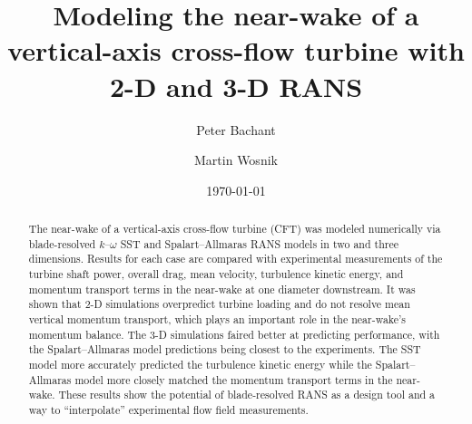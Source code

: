 \documentclass[aip,graphicx]{revtex4-1}
\begin{document}
\preprint{}

\title{Modeling the near-wake of a vertical-axis cross-flow turbine with 2-D and
    3-D RANS}



\author{Peter Bachant}

\author{Martin Wosnik}


\date{\today}

\begin{abstract}
    The near-wake of a vertical-axis cross-flow turbine (CFT) was modeled
    numerically via blade-resolved $k$--$\omega$ SST and Spalart--Allmaras RANS
    models in two and three dimensions. Results for each case are compared with
    experimental measurements of the turbine shaft power, overall drag, mean
    velocity, turbulence kinetic energy, and momentum transport terms in the
    near-wake at one diameter downstream. It was shown that 2-D simulations
    overpredict turbine loading and do not resolve mean vertical momentum
    transport, which plays an important role in the near-wake's momentum
    balance. The 3-D simulations faired better at predicting performance, with
    the Spalart--Allmaras model predictions being closest to the experiments.
    The SST model more accurately predicted the turbulence kinetic energy while
    the Spalart--Allmaras model more closely matched the momentum transport
    terms in the near-wake. These results show the potential of blade-resolved
    RANS as a design tool and a way to ``interpolate'' experimental flow field
    measurements.
\end{abstract}
\end{document}

